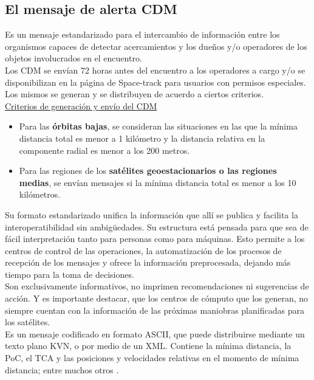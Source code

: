 \subsection{El mensaje de alerta CDM}\label{subsec:cdm}

Es un mensaje estandarizado para el intercambio de informaci\'on entre los organismos capaces de detectar acercamientos y los due\~nos y/o operadores de los objetos involucrados en el encuentro.\\
Los CDM se env\'ian 72 horas antes del encuentro a los operadores a cargo y/o se disponibilizan en la p\'agina de Space-track para usuarios con permisos especiales. Los mismos se generan y se distribuyen de acuerdo a ciertos criterios.\\


\underline{Criterios de generaci\'on y env\'io del CDM}
\begin{itemize}
\item Para las {\bf{\'orbitas bajas}}, se consideran las situaciones en las que la m\'inima distancia total es menor a 1 kil\'ometro y la distancia relativa en la componente radial es menor a los 200 metros.\\

\item Para las regiones de los {\bf{sat\'elites geoestacionarios o las regiones medias}}, se env\'ian mensajes si la m\'inima distancia total es menor a los 10 kil\'ometros.\\
\end{itemize}


Su formato estandarizado unifica la informaci\'on que all\'i se publica y facilita la interoperatibilidad sin ambig\"{u}edades. Su estructura est\'a pensada para que sea de f\'acil interpretaci\'on tanto para personas como para m\'aquinas. Esto permite a los centros de control de las operaciones, la automatizaci\'on de los procesos de recepci\'on de los mensajes y ofrece la informaci\'on preprocesada, dejando m\'as tiempo para la toma de decisiones.\\

Son exclusivamente informativos, no imprimen recomendaciones ni sugerencias de acci\'on.
Y es importante destacar, que los centros de c\'omputo que los generan, no siempre cuentan con la informaci\'on de las pr\'oximas maniobras planificadas para los sat\'elites.\\

Es un mensaje codificado en formato ASCII, que puede distribuirse mediante un texto plano \ac{KVN}, o por medio de un \ac{XML}. Contiene la m\'inima distancia, la PoC, el TCA y las posiciones y velocidades relativas en el momento de m\'inima distancia; entre muchos otros \citep{CDM}.\\

